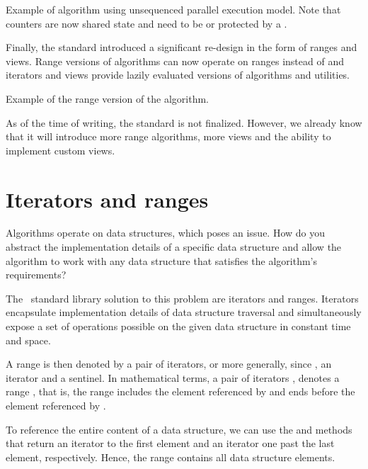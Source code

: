 \begin{box-note}
\footnotesize Example of  algorithm using unsequenced parallel execution model. Note that counters are now shared state and need to be  or protected by a .
\tcblower
{}
\end{box-note}

Finally, the  standard introduced a significant re-design in the form of ranges and views. Range versions of algorithms can now operate on ranges instead of  and  iterators and views provide lazily evaluated versions of algorithms and utilities.

\begin{box-note}
\footnotesize Example of the range version of the  algorithm.
\tcblower
{}
\end{box-note}

As of the time of writing, the  standard is not finalized. However, we already know that it will introduce more range algorithms, more views and the ability to implement custom views.

\section{Iterators and ranges}

Algorithms operate on data structures, which poses an issue. How do you abstract the implementation details of a specific data structure and allow the algorithm to work with any data structure that satisfies the algorithm's requirements?

The \CC\, standard library solution to this problem are iterators and ranges. Iterators encapsulate implementation details of data structure traversal and simultaneously expose a set of operations possible on the given data structure in constant time and space.

A range is then denoted by a pair of iterators, or more generally, since , an iterator and a sentinel. In mathematical terms, a pair of iterators ,  denotes a range \cpp{[it1, it2)}, that is, the range includes the element referenced by  and ends before the element referenced by .

To reference the entire content of a data structure, we can use the  and  methods that return an iterator to the first element and an iterator one past the last element, respectively. Hence, the range \cpp{[begin, end)} contains all data structure elements.

